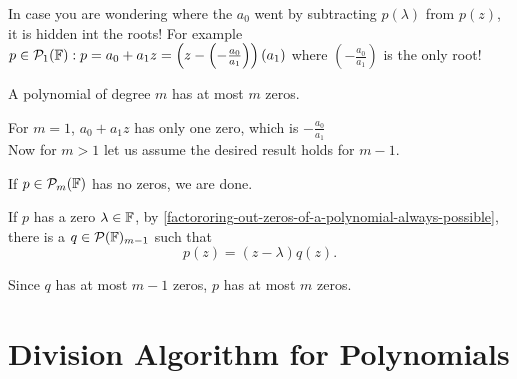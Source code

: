 In case you are wondering where the $a_0$ went by subtracting $p(\lambda)$ from $p(z)$, it is hidden int the roots! For example $p\in \mathcal{P}_1(\mathbb{F}): p=a_0+a_1z = \left(z- \left(-\frac{a_0}{a_1}\right)\right)(a_1)$ where $\left(-\frac{a_0}{a_1}\right)$ is the only root!

\setcounter{thm}{7}
\begin{thm}
  A polynomial of degree $m$ has at most $m$ zeros.
\end{thm}
\begin{prf} 
  For $m=1$, $a_0+a_1z$ has only one zero, which is $-\frac{a_0}{a_1}$\\
  Now for $m>1$ let us assume the desired result holds for $m-1$. 
  
  If $p\in \mathcal{P}_{m}(\mathbb{F})$ has no zeros, we are done. 
  
  If $p$ has a zero $\lambda \in \mathbb{F}$, by \ref{factororing-out-zeros-of-a-polynomial-always-possible}, there is a $q \in \mathcal{P}(\mathbb{F})_{m-1}$ such that 
  \begin{equation}
  	p(z)=(z-\lambda)q(z).
  \end{equation}
   
  Since $q$ has at most $m-1$ zeros, $p$ has at most $m$ zeros.
\end{prf}

\section{Division Algorithm for Polynomials}

